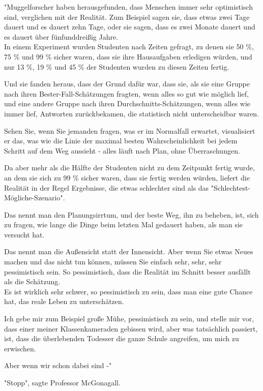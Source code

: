 {"Muggelforscher haben herausgefunden, dass Menschen immer sehr optimistisch sind, verglichen mit der Realität. Zum Beispiel sagen sie, dass etwas zwei Tage dauert und es dauert zehn Tage, oder sie sagen, dass es zwei Monate dauert und es dauert über fünfunddreißig Jahre.\\ In einem Experiment wurden Studenten nach Zeiten gefragt, zu denen sie 50 \%, 75 \% und 99 \% sicher waren, dass sie ihre Hausaufgaben erledigen würden, und nur 13 \%, 19 \% und 45 \% der Studenten wurden zu diesen Zeiten fertig.

Und sie fanden heraus, dass der Grund dafür war, dass sie, als sie eine Gruppe nach ihren Bester-Fall-Schätzungen fragten, wenn alles so gut wie möglich lief, und eine andere Gruppe nach ihren Durchschnitts-Schätzungen, wenn alles wie immer lief, Antworten zurückbekamen, die statistisch nicht unterscheidbar waren.

Sehen Sie, wenn Sie jemanden fragen, was er im Normalfall erwartet, visualisiert er das, was wie die Linie der maximal besten Wahrscheinlichkeit bei jedem Schritt auf dem Weg aussieht - alles läuft nach Plan, ohne Überraschungen.

Da aber mehr als die Hälfte der Studenten nicht zu dem Zeitpunkt fertig wurde, an dem sie sich zu 99 \% sicher waren, dass sie fertig werden würden, liefert die Realität in der Regel Ergebnisse, die etwas schlechter sind als das "Schlechtest-Mögliche-Szenario".

Das nennt man den Planungsirrtum, und der beste Weg, ihn zu beheben, ist, sich zu fragen, wie lange die Dinge beim letzten Mal gedauert haben, als man sie versucht hat.

Das nennt man die Außensicht statt der Innensicht. Aber wenn Sie etwas Neues machen und das nicht tun können, müssen Sie einfach sehr, sehr, sehr pessimistisch sein. So pessimistisch, dass die Realität im Schnitt besser ausfällt als die Schätzung.\\ Es ist wirklich sehr schwer, so pessimistisch zu sein, dass man eine gute Chance hat, das reale Leben zu unterschätzen.

Ich gebe mir zum Beispiel große Mühe, pessimistisch zu sein, und stelle mir vor, dass einer meiner Klassenkameraden gebissen wird, aber was tatsächlich passiert, ist, dass die überlebenden Todesser die ganze Schule angreifen, um mich zu erwischen.

Aber wenn wir schon dabei sind -"

"Stopp", sagte Professor McGonagall.

}
